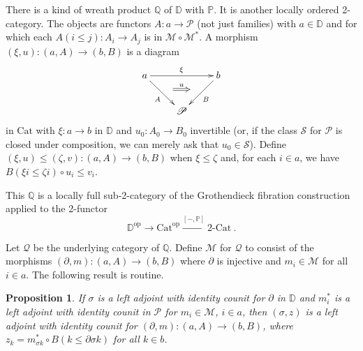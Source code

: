 \documentclass[a4paper,12pt,reqno]{amsart}
\newtheorem{proposition}[theorem]{Proposition}
\theoremstyle{definition}
\theoremstyle{fact}
\theoremstyle{genquest}
\theoremstyle{step}
\newcommand{\lra}{\longrightarrow}
\newcommand{\ra}{\rightarrow}
\def\CM{{\mathscr M}}
\def\CP{{\mathscr P}}
\def\CQ{{\mathscr Q}}
\def\CS{{\mathscr S}}
\begin{document}
There is a kind of wreath product $\mathbb{Q}$ of $\mathbb{D}$ with $\mathbb{P}$. 
It is another locally ordered 2-category.
The objects are functors $A : a \ra \CP$ (not just families) with $a\in \mathbb{D}$
and for which each $A(i\le j) : A_i\ra A_j$ is in $\CM \circ \CM^*$.
A morphism $(\xi , u) : (a,A) \ra (b,B)$ is a diagram
\begin{equation}
\xymatrix{
a \ar[rd]_{A}^(0.5){\phantom{a}}="1" \ar[rr]^{\xi}  && b \ar[ld]^{B}_(0.5){\phantom{a}}="2" \ar@{=>}"1";"2"^-{u}
\\
& \CP 
}
\end{equation}
in $\mathrm{Cat}$ with $\xi : a \ra b$ in $\mathbb{D}$ and $u_0:A_0\ra B_0$ invertible
(or, if the class $\CS$ for $\CP$ is closed under composition, we can merely ask that
$u_0\in \CS$).
Define  $(\xi , u) \le (\zeta,v) : (a,A) \ra (b,B)$ when $\xi \le \zeta$
and, for each $i\in a$, we have $B(\xi i\le \zeta i)\circ u_i \le v_i$.

This $\mathbb{Q}$ is a locally full sub-2-category of the Grothendieck fibration 
construction applied to the 2-functor
$$\mathbb{D}^{\mathrm{op}} \lra \mathrm{Cat}^{\mathrm{op}} \stackrel{[-,\mathbb{P}]} \lra \text{2-}\mathrm{Cat} \ .$$

Let $\CQ$ be the underlying category of $\mathbb{Q}$.
Define $\CM$ for $\CQ$ to consist of the morphisms $(\partial,m) : (a,A) \ra (b,B)$
where $\partial$ is injective and $m_i\in \CM$ for all $i \in a$.
The following result is routine.
\begin{proposition}\label{lali}
If $\sigma$ is a left adjoint with identity counit for $\partial$ in $\mathbb{D}$ and 
$m_i^*$ is a left adjoint with identity counit in $\CP$ for $m_i \in \CM$, $i\in a$, 
then $(\sigma, z)$ is a left adjoint with identity counit for $(\partial,m):(a,A)\ra(b,B)$,
where $z_k=m_{\sigma k}^*\circ B(k\le \partial \sigma k)$ for all $k \in b$.
\end{proposition} 
\end{document}

